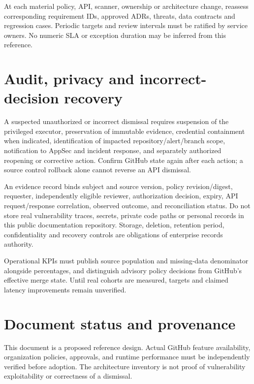 \documentclass[11pt,letterpaper]{article}
\begin{document}
At each material policy, API, scanner, ownership or architecture change, reassess corresponding requirement IDs, approved ADRs, threats, data contracts and regression cases. Periodic targets and review intervals must be ratified by service owners. No numeric SLA or exception duration may be inferred from this reference.

\section{Audit, privacy and incorrect-decision recovery}
A suspected unauthorized or incorrect dismissal requires suspension of the privileged executor, preservation of immutable evidence, credential containment when indicated, identification of impacted repository/alert/branch scope, notification to AppSec and incident response, and separately authorized reopening or corrective action. Confirm GitHub state again after each action; a source control rollback alone cannot reverse an API dismissal.

An evidence record binds subject and source version, policy revision/digest, requester, independently eligible reviewer, authorization decision, expiry, API request/response correlation, observed outcome, and reconciliation status. Do not store real vulnerability traces, secrets, private code paths or personal records in this public documentation repository. Storage, deletion, retention period, confidentiality and recovery controls are obligations of enterprise records authority.

Operational KPIs must publish source population and missing-data denominator alongside percentages, and distinguish advisory policy decisions from GitHub's effective merge state. Until real cohorts are measured, targets and claimed latency improvements remain unverified.

\section*{Document status and provenance}
This document is a proposed reference design. Actual GitHub feature availability, organization policies, approvals, and runtime performance must be independently verified before adoption. The architecture inventory is not proof of vulnerability exploitability or correctness of a dismissal.
\end{document}
